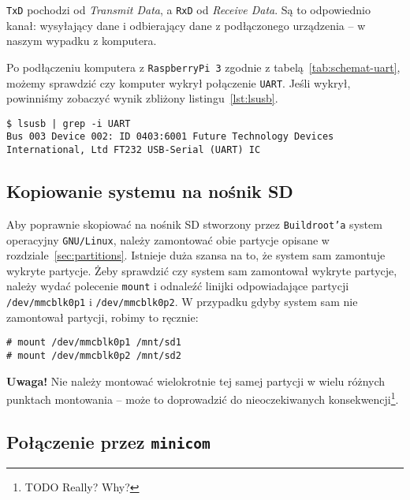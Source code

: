 \documentclass{article}
\begin{document}
\texttt{TxD} pochodzi od \emph{Transmit Data}, a \texttt{RxD} od \emph{Receive Data}. Są to odpowiednio kanał: wysyłający dane i odbierający dane z podłączonego urządzenia -- w naszym wypadku z komputera.

Po podłączeniu komputera z \texttt{RaspberryPi~3} zgodnie z tabelą~\ref{tab:schemat-uart}, możemy sprawdzić czy komputer wykrył połączenie \texttt{UART}. Jeśli wykrył, powinniśmy zobaczyć wynik zbliżony listingu~\ref{lst:lsusb}.
\begin{lstlisting}[basicstyle=\ttfamily,breaklines=true,label={lst:lsusb},captionpos=b,caption={Wynik komendy \texttt{lsusb} po podłączeniu \texttt{RaspberryPi} do komputera}]
$ lsusb | grep -i UART
Bus 003 Device 002: ID 0403:6001 Future Technology Devices International, Ltd FT232 USB-Serial (UART) IC
\end{lstlisting}


\subsection{Kopiowanie systemu na nośnik SD}

Aby poprawnie skopiować na nośnik SD stworzony przez \texttt{Buildroot'a} system operacyjny \texttt{GNU/Linux}, należy zamontować obie partycje opisane w rozdziale~\ref{sec:partitions}. Istnieje duża szansa na to, że system sam zamontuje wykryte partycje. Żeby sprawdzić czy system sam zamontował wykryte partycje, należy wydać polecenie \texttt{mount} i odnaleźć linijki odpowiadające partycji \texttt{/dev/mmcblk0p1} i \texttt{/dev/mmcblk0p2}. W przypadku gdyby system sam nie zamontował partycji, robimy to ręcznie:
\begin{lstlisting}[basicstyle=\ttfamily,breaklines=true]
# mount /dev/mmcblk0p1 /mnt/sd1
# mount /dev/mmcblk0p2 /mnt/sd2
\end{lstlisting}
\textbf{Uwaga!} Nie należy montować wielokrotnie tej samej partycji w wielu różnych punktach montowania -- może to doprowadzić do nieoczekiwanych konsekwencji\footnote{TODO Really? Why?}.


\subsection{Połączenie przez \texttt{minicom}}
\end{document}

